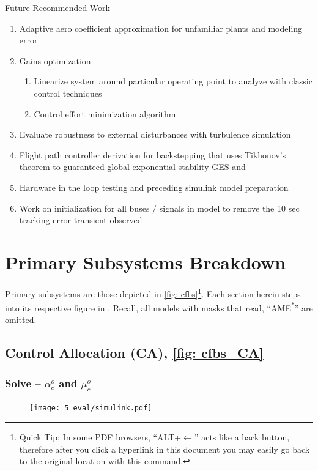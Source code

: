 \documentclass[12pt]{ucthesis}
\begin{document}
Future Recommended Work 
\begin{enumerate}[labelindent=\parindent,leftmargin=\parindent,noitemsep,nosep]
\item Adaptive aero coefficient approximation for unfamiliar plants and modeling error
\item Gains optimization
\begin{enumerate}[labelindent=\parindent,leftmargin=\parindent,noitemsep,nosep]
\item Linearize system around particular operating point to analyze with classic control techniques
\item Control effort minimization algorithm
\end{enumerate}
\item Evaluate robustness to external disturbances with turbulence simulation
\item Flight path controller derivation for backstepping that uses Tikhonov's theorem to guaranteed global exponential stability GES \citet{Farrell2008} and \citet{Farrell2009}
\item Hardware in the loop testing and preceding simulink model preparation
\item Work on initialization for all buses / signals in model to remove the 10 sec tracking error transient observed
\end{enumerate}



\appendix
\noappendicestocpagenum
\addappheadtotoc

\chapter{Primary Subsystems Breakdown} 
\label{chp: app}
Primary subsystems are those depicted in \autoref{fig: cfbs}\footnote{Quick Tip: In some PDF browsers, ``ALT+$\leftarrow$'' acts like a back button, therefore after you click a hyperlink in this document you may easily go back to the original location with this command.}. Each section herein steps into its respective figure in . Recall, all models with masks that read, ``AME\textsuperscript{*}'' are omitted. %
\section{Control Allocation (CA), \autoref{fig: cfbs_CA}} \label{sec: app_CA}
\subsection{\texorpdfstring{Solve -- $\alpha^o_c$ and $\mu^o_c$}{Solve -- Angle-of-Attack and Roll Commands}} \label{subsec: app_CA_am}
	\begin{figure}[H]
		\begin{adjustwidth}{-1in}{-1in}%
			\centering
			\texttt{[image: 5\_eval/simulink.pdf]}%
		\end{adjustwidth}
		\label{fig: cfbs_CA_am}
	\end{figure}
\end{document}
